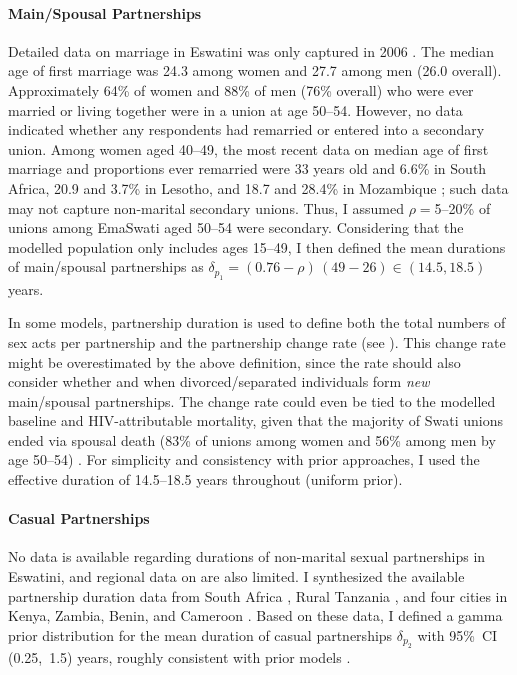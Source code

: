 \paragraph{Main/Spousal Partnerships}
Detailed data on marriage in Eswatini was only captured in 2006 \cite[Table~6.1]{SDHS2006}.
The median age of first marriage was 24.3 among women and 27.7 among men (26.0 overall).
Approximately 64\% of women and 88\% of men (76\% overall) who were ever married or living together
were in a union at age 50--54.
However, no data indicated whether any respondents had remarried or entered into a secondary union.
Among women aged 40--49, the most recent data on
median age of first marriage and proportions ever remarried were
33 years old and 6.6\% in South Africa,
20.9 and 3.7\% in Lesotho, and 18.7 and 28.4\% in Mozambique \cite{John2022};
such data may not capture non-marital secondary unions.
Thus, I assumed $\rho = {}$5--20\% of unions among EmaSwati aged 50--54 were secondary.
Considering that the modelled population only includes ages 15--49,
I then defined the mean durations of main/spousal partnerships as
$\delta_{p_{1}} =  (0.76 - \rho)\,(49 - 26) \in (14.5, 18.5)$ years.
\par
In some models, partnership duration is used to define both
the total numbers of sex acts per partnership and the partnership change rate (see ).
This change rate might be overestimated by the above definition,
since the rate should also consider whether and when
divorced/separated individuals form \emph{new} main/spousal partnerships.
The change rate could even be tied to the modelled baseline and HIV-attributable mortality,
given that the majority of Swati unions ended via spousal death
(83\% of unions among women and 56\% among men by age 50--54) \cite{SDHS2006}.
For simplicity and consistency with prior approaches,
I used the effective duration of 14.5--18.5 years throughout (uniform prior).
\paragraph{Casual Partnerships}
No data is available regarding durations of non-marital sexual partnerships in Eswatini,
and regional data on are also limited.
I synthesized the available partnership duration data from
South Africa \cite{Harrison2008,Hargreaves2009,Nguyen2015},
Rural Tanzania \cite{Nnko2004},
and four cities in Kenya, Zambia, Benin, and Cameroon \cite{Ferry2001}.
Based on these data, I defined a gamma prior distribution for
the mean duration of casual partnerships $\delta_{p_{2}}$ with 95\%~CI (0.25,~1.5) years,
roughly consistent with prior models \cite{Johnson2009}.
